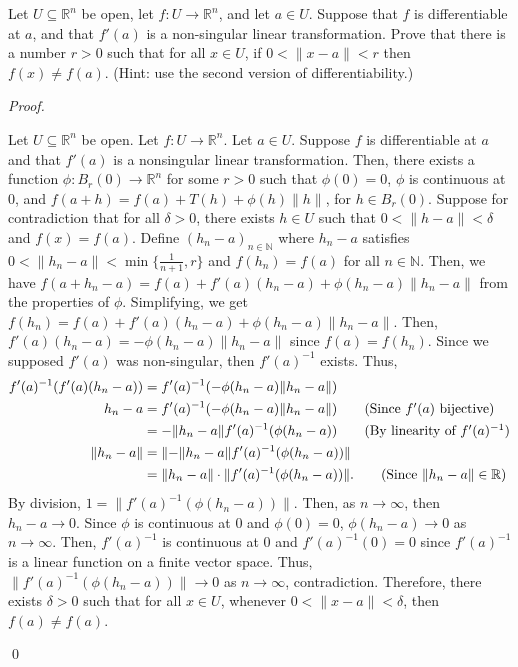 \documentclass[12pt]{article}
\newenvironment{problem}[2][Problem]{\begin{trivlist}
\item[\hskip \labelsep {\bfseries #1}\hskip \labelsep {\bfseries
#2.}]}{\end{trivlist}}
\newenvironment{sol}
    {\emph{Proof.}
    }
    {
    \qed
    }
\begin{document}
\begin{problem}{9}
  Let $U \subseteq \mathbb{R}^n$ be open, let $f: U \to \mathbb{R}^n$, and let $a \in U$. Suppose that $f$ is differentiable at $a$, and that $f'(a)$ is a non-singular linear transformation. Prove that there is a number $r > 0$ such that for all $x \in U$, if $0 < \lVert x - a \rVert < r$ then $f(x) \neq f(a)$. (Hint: use the second version of differentiability.)
  \end{problem}
  \begin{sol}
  Let $U \subseteq \mathbb{R}^n$ be open. Let $f : U \to \mathbb{R}^n$. Let $a \in U$. Suppose $f$ is differentiable at $a$ and that $f'(a)$ is a nonsingular linear transformation. Then, there exists a function $\phi : B_r(0) \to \mathbb{R}^n$ for some $r > 0$ such that $\phi(0) = 0$, $\phi$ is continuous at 0, and $f(a+h) = f(a) + T(h) + \phi(h) \lVert h \rVert$, for $h \in B_r(0)$.  Suppose for contradiction that for all $\delta > 0$, there exists $h \in U$ such that $0 < \lVert h - a \rVert < \delta$ and $f(x) = f(a)$. Define $(h_n-a)_{n \in \mathbb{N}}$ where $h_n - a$ satisfies $0 < \lVert h_n - a \rVert < \min \{\frac{1}{n+1},r \}$ and $f(h_n) = f(a)$ for all $n \in \mathbb{N}$. Then, we have $f(a+h_n-a) = f(a) + f'(a)(h_n-a) + \phi(h_n-a) \lVert h_n - a \rVert$ from the properties of $\phi$. Simplifying, we get $f(h_n) = f(a) + f'(a)(h_n-a) + \phi(h_n-a) \lVert h_n - a \rVert$. Then, $f'(a)(h_n - a) = -\phi(h_n - a) \lVert h_n - a \rVert$ since $f(a) = f(h_n)$. Since we supposed $f'(a)$ was non-singular, then $f'(a)^{-1}$ exists. Thus, \begin{align*}
      f'(a)^{-1}(f'(a)(h_n - a)) &= f'(a)^{-1}(-\phi(h_n - a) \lVert h_n - a \rVert) \\ h_n - a &= f'(a)^{-1}(-\phi(h_n - a) \lVert h_n - a \rVert) \tag*{(Since $f'(a)$ bijective)} \\ &= - \lVert h_n - a \rVert f'(a)^{-1}( \phi (h_n - a)) \tag*{(By linearity of $f'(a)^{-1}$)} \\ \lVert h_n - a \rVert &= \lVert - \lVert h_n - a \rVert f'(a)^{-1}( \phi (h_n - a)) \rVert \\ &= \lVert h_n - a \rVert \cdot \lVert f'(a)^{-1}(\phi(h_n - a))\rVert. \tag*{(Since $\lVert h_n - a \rVert \in \mathbb{R}$)} 
  \end{align*}
  By division, $1 = \lVert f'(a)^{-1}(\phi (h_n - a))\rVert$. Then, as $n \to \infty$, then $h_n - a \to 0$. Since $\phi$ is continuous at 0 and $\phi(0) = 0$, $\phi(h_n - a) \to 0$ as $n \to \infty$. Then, $f'(a)^{-1}$ is continuous at 0 and $f'(a)^{-1}(0) = 0$ since $f'(a)^{-1}$ is a linear function on a finite vector space. Thus, $\lVert f'(a)^{-1}(\phi (h_n - a)) \rVert \to 0$ as $n \to \infty$, contradiction. Therefore, there exists $\delta > 0$ such that for all $x \in U$, whenever $0 < \lVert x - a \rVert < \delta$, then $f(a) \neq f(a)$.
  \end{sol}
  
\end{document}
